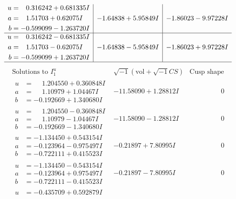 \documentclass[1p]{elsarticle_modified}
\theoremstyle{definition}
\newcommand{\I}{\sqrt{-1}}
\begin{document}
$$\begin{array}{c|c|c}
\begin{aligned}
u &= \phantom{-}0.316242 + 0.681335 I \\
a &= \phantom{-}1.51703 + 0.62075 I \\
b &= -0.599099 - 1.263720 I\end{aligned}
 & -1.64838 + 5.95849 I & -1.86023 - 9.97228 I \\ \hline\begin{aligned}
u &= \phantom{-}0.316242 - 0.681335 I \\
a &= \phantom{-}1.51703 - 0.62075 I \\
b &= -0.599099 + 1.263720 I\end{aligned}
 & -1.64838 - 5.95849 I & -1.86023 + 9.97228 I\\
 \hline 
 \end{array}$$\newpage$$\begin{array}{c|c|c}  
\text{Solutions to }I^u_{1}& \I (\text{vol} + \sqrt{-1}CS) & \text{Cusp shape}\\
 \hline 
\begin{aligned}
u &= \phantom{-}1.204550 + 0.360848 I \\
a &= \phantom{-}1.10979 + 1.04467 I \\
b &= -0.192669 + 1.340680 I\end{aligned}
 & -11.58090 + 1.28812 I & \phantom{-0.000000 } 0 \\ \hline\begin{aligned}
u &= \phantom{-}1.204550 - 0.360848 I \\
a &= \phantom{-}1.10979 - 1.04467 I \\
b &= -0.192669 - 1.340680 I\end{aligned}
 & -11.58090 - 1.28812 I & \phantom{-0.000000 } 0 \\ \hline\begin{aligned}
u &= -1.134450 + 0.543154 I \\
a &= -0.123964 - 0.975497 I \\
b &= -0.722111 + 0.415523 I\end{aligned}
 & -0.21897 + 7.80995 I & \phantom{-0.000000 } 0 \\ \hline\begin{aligned}
u &= -1.134450 - 0.543154 I \\
a &= -0.123964 + 0.975497 I \\
b &= -0.722111 - 0.415523 I\end{aligned}
 & -0.21897 - 7.80995 I & \phantom{-0.000000 } 0 \\ \hline\begin{aligned}
u &= -0.435709 + 0.592879 I \\

\end{aligned}
\end{array}$$
\end{document}
